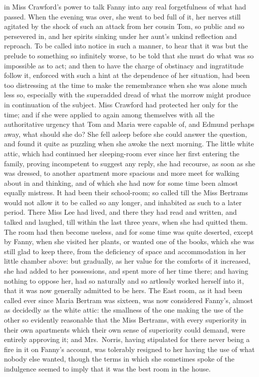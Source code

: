  in Miss Crawford's power to talk Fanny into any
real forgetfulness of what had passed.  When the evening
was over, she went to bed full of it, her nerves still
agitated by the shock of such an attack from her cousin Tom,
so public and so persevered in, and her spirits sinking
under her aunt's unkind reflection and reproach.
To be called into notice in such a manner, to hear that it
was but the prelude to something so infinitely worse,
to be told that she must do what was so impossible as to act;
and then to have the charge of obstinacy and ingratitude
follow it, enforced with such a hint at the dependence
of her situation, had been too distressing at the time
to make the remembrance when she was alone much less so,
especially with the superadded dread of what the
morrow might produce in continuation of the subject.
Miss Crawford had protected her only for the time;
and if she were applied to again among themselves with all
the authoritative urgency that Tom and Maria were capable of,
and Edmund perhaps away, what should she do?  She fell
asleep before she could answer the question, and found
it quite as puzzling when she awoke the next morning.
The little white attic, which had continued her sleeping-room
ever since her first entering the family, proving incompetent
to suggest any reply, she had recourse, as soon as she
was dressed, to another apartment more spacious and more
meet for walking about in and thinking, and of which she
had now for some time been almost equally mistress.
It had been their school-room; so called till the Miss
Bertrams would not allow it to be called so any longer,
and inhabited as such to a later period.  There Miss
Lee had lived, and there they had read and written,
and talked and laughed, till within the last three years,
when she had quitted them.  The room had then become useless,
and for some time was quite deserted, except by Fanny,
when she visited her plants, or wanted one of the books,
which she was still glad to keep there, from the deficiency
of space and accommodation in her little chamber above:
but gradually, as her value for the comforts of it increased,
she had added to her possessions, and spent more of her
time there; and having nothing to oppose her, had so
naturally and so artlessly worked herself into it, that it
was now generally admitted to be hers.  The East room,
as it had been called ever since Maria Bertram was sixteen,
was now considered Fanny's, almost as decidedly as the
white attic:  the smallness of the one making the use of
the other so evidently reasonable that the Miss Bertrams,
with every superiority in their own apartments which their
own sense of superiority could demand, were entirely
approving it; and Mrs.\ Norris, having stipulated for there
never being a fire in it on Fanny's account, was tolerably
resigned to her having the use of what nobody else wanted,
though the terms in which she sometimes spoke of the
indulgence seemed to imply that it was the best room in
the house.

